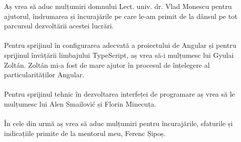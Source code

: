 
Aș vrea să aduc mulțumiri domnului Lect. univ. dr. Vlad Monescu pentru ajutorul, îndrumarea și încurajările pe care le-am primit de la dânsul pe tot parcursul dezvoltării acestei lucrări.
\\ \\
Pentru sprijinul în configurarea adecvată a proiectului de Angular și pentru sprijinul învățării limbajului TypeScript, aș vrea să-i mulțumesc lui Gyulai Zoltán. Zoltán mi-a fost de mare ajutor în procesul de înțelegere al particularităților Angular.
\\ \\
Pentru sprijinul tehnic în dezvoltarea interfeței de programare aș vrea să le mulțumesc lui Alen Smailović și Florin Minecuța.
\\ \\
În cele din urmă aș vrea să aduc mulțumiri pentru încurajările, sfaturile și indicațiile primite de la mentorul meu, Ferenc Șipoș.